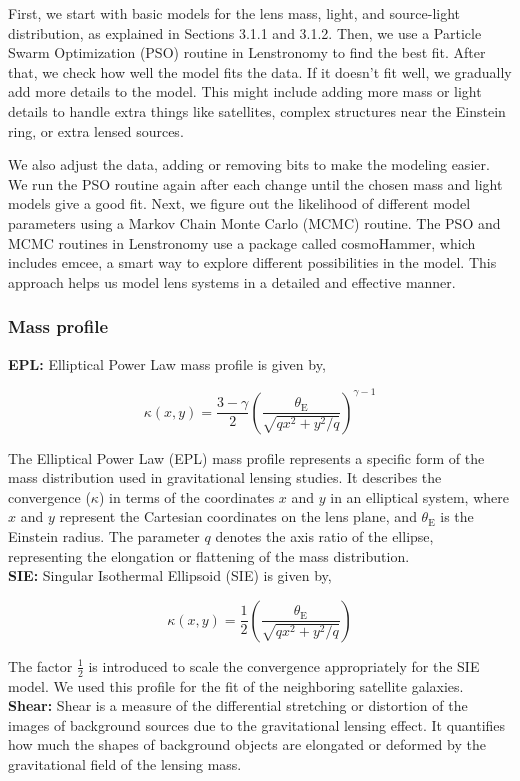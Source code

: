\documentclass{aa}
\begin{document}
First, we start with basic models for the lens mass, light, and source-light distribution, as explained in Sections 3.1.1 and 3.1.2. Then, we use a Particle Swarm Optimization (PSO) routine in Lenstronomy to find the best fit. After that, we check how well the model fits the data. If it doesn't fit well, we gradually add more details to the model. This might include adding more mass or light details to handle extra things like satellites, complex structures near the Einstein ring, or extra lensed sources.

We also adjust the data, adding or removing bits to make the modeling easier. We run the PSO routine again after each change until the chosen mass and light models give a good fit. Next, we figure out the likelihood of different model parameters using a Markov Chain Monte Carlo (MCMC) routine. The PSO and MCMC routines in Lenstronomy use a package called cosmoHammer, which includes emcee, a smart way to explore different possibilities in the model. This approach helps us model lens systems in a detailed and effective manner.


\subsubsection{Mass profile}
\textbf{EPL:} Elliptical Power Law mass profile is given by, 

$$
\kappa\left(x, y\right)=\frac{3-\gamma}{2}\left(\frac{\theta_{\mathrm{E}}}{\sqrt{q x^2+y^2 / q}}\right)^{\gamma-1}
$$

The Elliptical Power Law (EPL) mass profile represents a specific form of the mass distribution used in gravitational lensing studies. It describes the convergence (\(\kappa\)) in terms of the coordinates \(x\) and \(y\) in an elliptical system, where \(x\) and \(y\) represent the Cartesian coordinates on the lens plane, and \(\theta_{\mathrm{E}}\) is the Einstein radius. The parameter \(q\) denotes the axis ratio of the ellipse, representing the elongation or flattening of the mass distribution.
\\
\newline
\textbf{SIE:} Singular Isothermal Ellipsoid (SIE) is given by,

$$
\kappa\left(x, y\right)=\frac{1}{2}\left(\frac{\theta_{\mathrm{E}}}{\sqrt{q x^2+y^2 / q}}\right)
$$

The factor $\frac{1}{2}$ is introduced to scale the convergence appropriately for the SIE model. We used this profile for the fit of the neighboring satellite galaxies.
\\
\newline
\textbf{Shear:} Shear is a measure of the differential stretching or distortion of the images of background sources due to the gravitational lensing effect. It quantifies how much the shapes of background objects are elongated or deformed by the gravitational field of the lensing mass.\\
\end{document}
